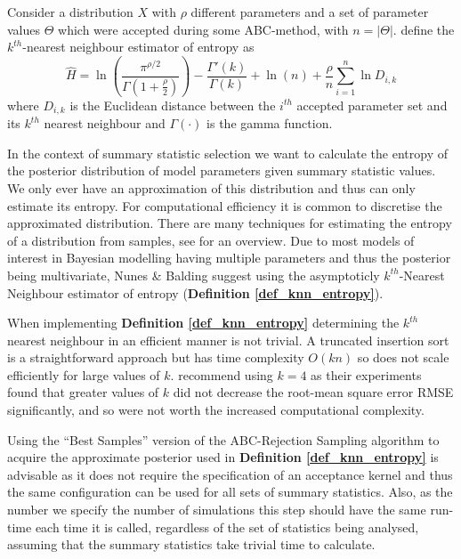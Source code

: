 \documentclass[11pt,a4paper]{article}
\theoremstyle{break}
\begin{document}
  \begin{box_definition}\label{def_knn_entropy}
    Consider a distribution $X$ with $\rho$ different parameters and a set of parameter values $\Theta$ which were accepted during some ABC-method, with $n=|\Theta|$. \cite{nearest_neighbour_estimates_of_entropy} define the $k^{th}$-nearest neighbour estimator of entropy as
    \[ \hat{H}=\ln\left(\frac{\pi^{\rho/2}}{\Gamma\left(1+\frac\rho2\right)}\right)-\frac{\Gamma'(k)}{\Gamma(k)}+\ln(n)+\frac\rho{n}\sum_{i=1}^n\ln D_{i,k} \]
    where $D_{i,k}$ is the Euclidean distance between the $i^{th}$ accepted parameter set and its $k^{th}$ nearest neighbour and $\Gamma(\cdot)$ is the gamma function.
  \end{box_definition}

  \par In the context of summary statistic selection we want to calculate the entropy of the posterior distribution of model parameters given summary statistic values. We only ever have an approximation of this distribution and thus can only estimate its entropy. For computational efficiency it is common to discretise the approximated distribution. There are many techniques for estimating the entropy of a distribution from samples, see \cite[]{non_parameteric_entropy_estimation} for an overview. Due to most models of interest in Bayesian modelling having multiple parameters and thus the posterior being multivariate, Nunes \& Balding suggest using the asymptoticly $k^{th}$-Nearest Neighbour estimator of entropy \cite{nearest_neighbour_estimates_of_entropy} (\textbf{Definition \ref{def_knn_entropy}}).

  \par When implementing \textbf{Definition \ref{def_knn_entropy}} determining the $k^{th}$ nearest neighbour in an efficient manner is not trivial. A truncated insertion sort is a straightforward approach but has time complexity $O(kn)$ so does not scale efficiently for large values of $k$. \cite[]{nearest_neighbour_estimates_of_entropy} recommend using $k=4$ as their experiments found that greater values of $k$ did not decrease the root-mean square error RMSE significantly, and so were not worth the increased computational complexity.

  \par Using the ``Best Samples'' version of the ABC-Rejection Sampling algorithm to acquire the approximate posterior used in \textbf{Definition \ref{def_knn_entropy}} is advisable as it does not require the specification of an acceptance kernel and thus the same configuration can be used for all sets of summary statistics. Also, as the number we specify the number of simulations this step should have the same run-time each time it is called, regardless of the set of statistics being analysed, assuming that the summary statistics take trivial time to calculate.
\end{document}
